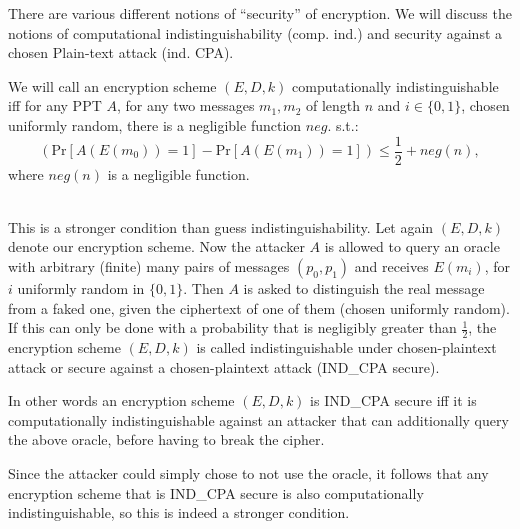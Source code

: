 There are various different notions of ``security'' of encryption. We will discuss the notions of %
computational indistinguishability (comp. ind.) and security against a chosen Plain-text attack (ind. CPA). 
\begin{definition}
  We will call an encryption scheme $(E,D,k)$ computationally indistinguishable iff for any PPT $A$, for any two messages $m_1, m_2$ of length $n$ and $i\in \{0,1\}$, chosen uniformly random, there is a negligible function $neg.$ s.t.:
  \[(\mathrm{Pr}\left[A(E(m_0))=1\right]-\mathrm{Pr}\left[A(E(m_1))=1\right])\leq \frac{1}{2}+neg(n), \] where $neg(n)$ is a negligible function.
\end{definition}
\begin{definition}\ \\
  This is a stronger condition than guess indistinguishability. 
  Let again $(E, D, k)$ denote our encryption scheme. 
  Now the attacker $A$ is allowed to query an oracle with arbitrary (finite) many pairs of messages $(p_0, p_1)$ and receives $E(m_i)$, for $i$ uniformly random in $\{0,1\}$. Then $A$ is asked to distinguish the real message from a faked one, given the ciphertext of one of them (chosen uniformly random). If this can only be done with a probability that is negligibly greater than $\frac{1}{2}$, the encryption scheme $(E, D, k)$ is called indistinguishable under chosen-plaintext attack or secure against a chosen-plaintext attack (IND\_CPA secure). 
  
  In other words an encryption scheme $(E, D, k)$ is IND\_CPA secure iff it is computationally indistinguishable against an attacker that can additionally query the above oracle, before having to break the cipher. 
  
  Since the attacker could simply chose to not use the oracle, it follows that any encryption scheme that is IND\_CPA secure is also computationally indistinguishable, so this is indeed a stronger condition. 
\end{definition}

